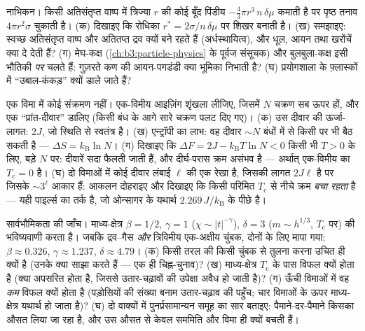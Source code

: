 \begin{exercise}[$\star\star$]\label{exo:b3:phase-transitions:9}
नाभिकन। किसी अतिसंतृप्त वाष्प में त्रिज्या $r$ की कोई बूँद
पिंडीय  $-\tfrac43\pi r^3\,n\,\delta\mu$ कमाती है पर
पृष्ठ तनाव $4\pi r^2\sigma$ चुकाती है। (क) दिखाइए कि रोधिका
$r^* = 2\sigma/n\,\delta\mu$ पर शिखर बनाती है। (ख) समझाइए: स्वच्छ
अतिसंतृप्त वाष्प और अतितप्त द्रव क्यों बने रहते हैं
(अर्धस्थायित्व), और धूल, आयन तथा खरोंचें क्या दे देती हैं?
(ग) मेघ-कक्ष (\cref{ch:b3:particle-physics} के पूर्वज संसूचक)
और बुलबुला-कक्ष इसी भौतिकी \emph{पर} चलते हैं: गुज़रते कण की
आयन-पगडंडी क्या भूमिका निभाती है? (घ) प्रयोगशाला के फ़्लास्कों में
``उबाल-कंकड़'' क्यों डाले जाते हैं?
\end{exercise}

\begin{exercise}[$\star\star\star$]\label{exo:b3:phase-transitions:10}
एक विमा में कोई संक्रमण नहीं। एक-विमीय आइज़िंग शृंखला लीजिए, जिसमें
$N$ चक्रण सब ऊपर हों, और एक ``प्रांत-दीवार'' डालिए (किसी बंध के आगे
सारे चक्रण पलट दिए गए)। (क) उस दीवार की ऊर्जा-लागत: $2J$,
जो स्थिति से स्वतंत्र है। (ख) एन्ट्रॉपी का लाभ: वह दीवार
$\sim N$ बंधों में से किसी पर भी बैठ सकती है --- $\Delta S = k_{\text{B}}\ln N$। (ग)
दिखाइए कि $\Delta F = 2J - k_{\text{B}}T\ln N < 0$ किसी भी $T > 0$ के
लिए, बड़े $N$ पर:
दीवारें सदा फैलती जाती हैं, और दीर्घ-परास क्रम असंभव है --- अर्थात्
एक-विमीय  का $T_{\text{c}} = 0$ है। (घ) दो
विमाओं में कोई दीवार लंबाई $\ell$ की एक रेखा है, जिसकी लागत $2J\ell$
है पर जिसके $\sim3^\ell$ आकार हैं: आकलन दोहराइए और दिखाइए कि किसी
परिमित $T_{\text{c}}$ से नीचे क्रम \emph{बचा रहता} है --- यही
पाइर्ल्स का तर्क है, जो ओन्सागर के यथार्थ $2.269\,J/k_{\text{B}}$ के
पीछे है।
\end{exercise}

\begin{exercise}[$\star\star\star$]\label{exo:b3:phase-transitions:11}
सार्वभौमिकता की जाँच। माध्य-क्षेत्र $\beta = 1/2$, $\gamma
= 1$ ($\chi \sim |t|^{-\gamma}$), $\delta = 3$ ($m \sim h^{1/3}$,
$T_{\text{c}}$ पर) की भविष्यवाणी करता है। जबकि द्रव--गैस  \emph{और} त्रिविमीय एक-अक्षीय चुंबक, दोनों के लिए मापा गया: $\beta
\approx 0.326$, $\gamma \approx 1.237$, $\delta \approx 4.79$।
(क) किसी तरल की किसी चुंबक से तुलना करना उचित ही क्यों है (उनके
 क्या साझा करते हैं --- एक ही चिह्न-चुनाव)? (ख)
माध्य-क्षेत्र $T_{\text{c}}$ के पास विफल क्यों होता है (क्या
अपसरित होता है, जिससे उतार-चढ़ावों की उपेक्षा अवैध हो जाती है)? (ग)
ऊँची विमाओं में वह \emph{कम} विफल क्यों होता है (पड़ोसियों की
संख्या बनाम उतार-चढ़ाव की पहुँच; चार विमाओं के ऊपर माध्य-क्षेत्र
यथार्थ हो जाता है)? (घ) दो वाक्यों में पुनर्प्रसामान्यन समूह का सार
बताइए: पैमाने-दर-पैमाने किसका औसत लिया जा रहा है, और उस औसत से केवल
सममिति और विमा ही क्यों बचती हैं।
\end{exercise}

